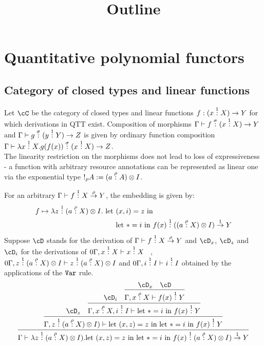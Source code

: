 \documentclass[12pt,a4paper]{article}
\title{\vspace{-5em}Outline}
\date{\vspace{-3em}}
\begin{document}
\maketitle

\section{Quantitative polynomial functors}
\subsection{Category of closed types and linear functions}
\label{sec:cat-closed-types}
Let $\cC$ be the category of closed types and linear functions $f : (x \overset{1}{:} X) \to Y $ for which derivations in QTT exist. Composition of morphisms $\Gamma \vdash f \overset{\sigma}{:} (x \overset{1}{:} X) \to Y$ and $\Gamma \vdash g \overset{\sigma}{:} (y \overset{1}{:} Y) \to Z$ is given by ordinary function composition $\Gamma \vdash \lambda x \overset{1}{:} X. g(f(x)) \overset{\sigma}{:} (x \overset{1}{:} X) \to Z $.\\

The linearity restriction on the morphisms does not lead to loss of expressiveness - a function with arbitrary resource annotations can be represented as linear one via the exponential type $!_\rho A := (a \overset{\rho}{:} A) \otimes I$.

For an arbitrary $\Gamma \vdash f \overset{1}{:} X \overset{\rho}{\to} Y$, the embedding is given by:
\begin{align*}
  f \mapsto \lambda z \overset{1}{:} (a \overset{\rho}{:}X) \otimes I . \text{ let } &(x,i) = z \text{ in} \\
  &\text{let } * = i \text{ in } f(x) \overset{1}{:}  ((a \overset{\rho}{:}X) \otimes I) \overset{1}{\to} Y
\end{align*}
Suppose $\cD$ stands for the derivation of $\Gamma \vdash f \overset{1}{:} X \overset{\rho}{\to} Y$ and  $\cD_x$, $\cD_z$ and $\cD_i$ for the derivations of $0\Gamma, x \overset{1}{:} X \vdash x \overset{1}{:} X$ \, , $0\Gamma, z \overset{1}{:}(a \overset{\rho}{:}X) \otimes I \vdash z \overset{1}{:} (a \overset{\rho}{:}X) \otimes I$ and $0\Gamma , i \overset{1}{:} I \vdash i \overset{1}{:} I$ obtained by the applications of the $\tt{Var}$ rule.
$$
\infer{\Gamma \vdash \lambda z \of{1} (a \of{\rho}X) \otimes I).\text{let } (x, z) = z \text{ in }  \text{let } * = i \text{ in } f(x) \of{1} (a \of{\rho}X) \otimes I) \ofto{1} Y}{
  \infer{\Gamma, z \of{1} (a \of{\rho}X) \otimes I) \vdash  \text{let } (x, z) = z \text{ in }  \text{let } * = i \text{ in } f(x) \of{1} Y}{
    \cD_z 
    &
    \infer{\Gamma, x \of{\rho} X, i \of{1} I \vdash \text{let } * = i \text{ in } f(x) \of{1} Y}{
      \cD_i
      & 
      \infer{\Gamma, x \of{\rho} X \vdash f(x) \of{1} Y}{
        \cD_x
        &
        \cD
      }
    }
  }
}
$$
\end{document}
